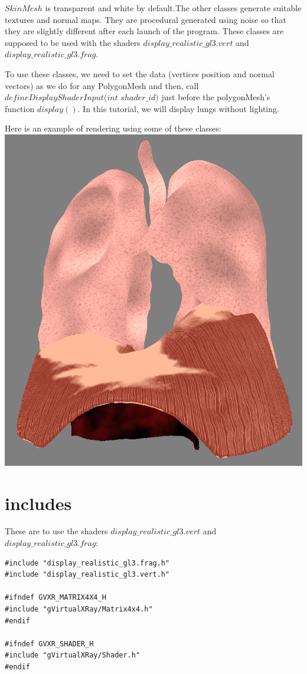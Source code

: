 \documentclass[12pt]{report}
\begin{document}
	$SkinMesh$ is transparent and white by default.The other classes generate suitable textures and normal maps. They are procedural generated using noise so that they are slightly different after each launch of the program. These classes are supposed to be used with the shaders $display\_realistic\_gl3.vert$ and $display\_realistic\_gl3.frag$. 

	To use these classes, we need to set the data (vertices position and normal vectors) as we do for any PolygonMesh and then, call $defineDisplayShaderInput(int$ $shader\_id)$ just before the polygonMesh's function $display()$. In this tutorial, we will display lungs without lighting.
	
\newpage

	Here is an example of rendering using some of these classes: \\
	
\includegraphics[scale = 0.6]{img/AllMeshes.png}


\chapter{includes}

These are to use the shaders $display\_realistic\_gl3.vert$ and $display\_realistic\_gl3.frag$:
\begin{lstlisting}
#include "display_realistic_gl3.frag.h"
#include "display_realistic_gl3.vert.h"

#ifndef GVXR_MATRIX4X4_H
#include "gVirtualXRay/Matrix4x4.h"
#endif

#ifndef GVXR_SHADER_H
#include "gVirtualXRay/Shader.h"
#endif
\end{lstlisting}
\end{document}
